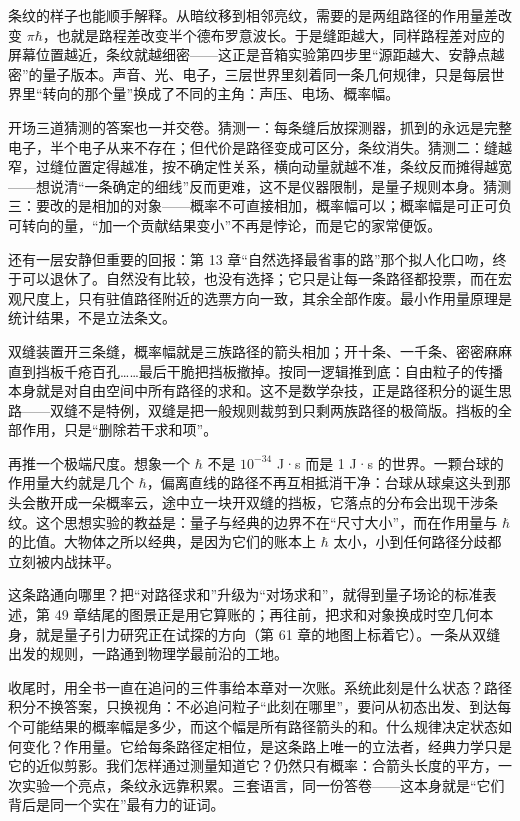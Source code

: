条纹的样子也能顺手解释。从暗纹移到相邻亮纹，需要的是两组路径的作用量差改变 \(\pi\hbar\)，也就是路程差改变半个德布罗意波长。于是缝距越大，同样路程差对应的屏幕位置越近，条纹就越细密——这正是音箱实验第四步里“源距越大、安静点越密”的量子版本。声音、光、电子，三层世界里刻着同一条几何规律，只是每层世界里“转向的那个量”换成了不同的主角：声压、电场、概率幅。

开场三道猜测的答案也一并交卷。猜测一：每条缝后放探测器，抓到的永远是完整电子，半个电子从来不存在；但代价是路径变成可区分，条纹消失。猜测二：缝越窄，过缝位置定得越准，按不确定性关系，横向动量就越不准，条纹反而摊得越宽——想说清“一条确定的细线”反而更难，这不是仪器限制，是量子规则本身。猜测三：要改的是相加的对象——概率不可直接相加，概率幅可以；概率幅是可正可负可转向的量，“加一个贡献结果变小”不再是悖论，而是它的家常便饭。

还有一层安静但重要的回报：第 13 章“自然选择最省事的路”那个拟人化口吻，终于可以退休了。自然没有比较，也没有选择；它只是让每一条路径都投票，而在宏观尺度上，只有驻值路径附近的选票方向一致，其余全部作废。最小作用量原理是统计结果，不是立法条文。


\begin{thought}[把缝开到无穷多]
双缝装置开三条缝，概率幅就是三族路径的箭头相加；开十条、一千条、密密麻麻直到挡板千疮百孔……最后干脆把挡板撤掉。按同一逻辑推到底：自由粒子的传播本身就是对自由空间中所有路径的求和。这不是数学杂技，正是路径积分的诞生思路——双缝不是特例，双缝是把一般规则裁剪到只剩两族路径的极简版。挡板的全部作用，只是“删除若干求和项”。

再推一个极端尺度。想象一个 \(\hbar\) 不是 \(10^{-34}\) J·s 而是 1 J·s 的世界。一颗台球的作用量大约就是几个 \(\hbar\)，偏离直线的路径不再互相抵消干净：台球从球桌这头到那头会散开成一朵概率云，途中立一块开双缝的挡板，它落点的分布会出现干涉条纹。这个思想实验的教益是：量子与经典的边界不在“尺寸大小”，而在作用量与 \(\hbar\) 的比值。大物体之所以经典，是因为它们的账本上 \(\hbar\) 太小，小到任何路径分歧都立刻被内战抹平。
\end{thought}

这条路通向哪里？把“对路径求和”升级为“对场求和”，就得到量子场论的标准表述，第 49 章结尾的图景正是用它算账的；再往前，把求和对象换成时空几何本身，就是量子引力研究正在试探的方向（第 61 章的地图上标着它）。一条从双缝出发的规则，一路通到物理学最前沿的工地。

收尾时，用全书一直在追问的三件事给本章对一次账。系统此刻是什么状态？路径积分不换答案，只换视角：不必追问粒子“此刻在哪里”，要问从初态出发、到达每个可能结果的概率幅是多少，而这个幅是所有路径箭头的和。什么规律决定状态如何变化？作用量。它给每条路径定相位，是这条路上唯一的立法者，经典力学只是它的近似剪影。我们怎样通过测量知道它？仍然只有概率：合箭头长度的平方，一次实验一个亮点，条纹永远靠积累。三套语言，同一份答卷——这本身就是“它们背后是同一个实在”最有力的证词。

